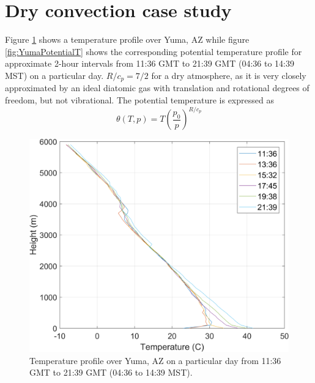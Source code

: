\documentclass[11pt]{article}
\begin{document}
\section{Dry convection case study}
Figure \ref{fig:YumaT} shows a temperature profile over Yuma, AZ while figure \ref{fig:YumaPotentialT} shows the corresponding potential temperature
profile for approximate 2-hour intervals from 11:36 GMT to 21:39 GMT (04:36 to 14:39 MST) on a particular day. $R/c_p = 7/2$ for a dry atmosphere, as it is very closely approximated by an ideal diatomic gas with translation and rotational degrees of freedom, but not vibrational. The potential temperature is expressed as
\begin{equation}
\theta(T,p) = T\left(\frac{p_0}{p}\right)^{R/c_p}
\end{equation}

\begin{figure}[h!]
	\centering
	\includegraphics[width=\textwidth]{YumaTemp.png}
	\caption{Temperature profile over Yuma, AZ on a particular day from 11:36 GMT to 21:39 GMT (04:36 to 14:39 MST).}
	\label{fig:YumaT}
\end{figure}
\end{document}
